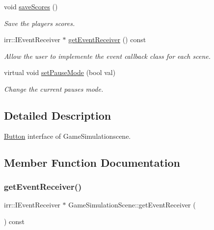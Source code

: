 \begin{DoxyCompactItemize}
\mbox{\label{classGameSimulationScene_afbe27c807e95e6a58f601e8ed3e7cf93}} 
void \hyperlink{classGameSimulationScene_afbe27c807e95e6a58f601e8ed3e7cf93}{save\+Scores} ()
\begin{DoxyCompactList}\small\item\em Save the players\textquotesingle{} scores. \end{DoxyCompactList}\item 
irr\+::\+I\+Event\+Receiver $\ast$ \hyperlink{classGameSimulationScene_a048b2a937caff3af7b4d54f8bd404ec1}{get\+Event\+Receiver} () const
\begin{DoxyCompactList}\small\item\em Allow the user to implemente the event callback class for each scene. \end{DoxyCompactList}\item 
virtual void \hyperlink{classGameSimulationScene_a34377bab69b7a81e50f3d2c42596c574}{set\+Pause\+Mode} (bool val)
\begin{DoxyCompactList}\small\item\em Change the current pause\textquotesingle{}s mode. \end{DoxyCompactList}\end{DoxyCompactItemize}


\subsection{Detailed Description}
\hyperlink{classButton}{Button} interface of Game\+Simulationscene. 

\subsection{Member Function Documentation}
\mbox{\label{classGameSimulationScene_a048b2a937caff3af7b4d54f8bd404ec1}} 
\subsubsection{\texorpdfstring{get\+Event\+Receiver()}{getEventReceiver()}}
{\footnotesize\ttfamily irr\+::\+I\+Event\+Receiver $\ast$ Game\+Simulation\+Scene\+::get\+Event\+Receiver (\begin{DoxyParamCaption}{ }\end{DoxyParamCaption}) const\hspace{0.3cm}{\ttfamily [virtual]}}



